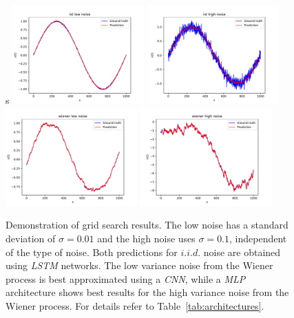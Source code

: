 \begin{figure}s
\centering
    \includegraphics[width=0.45\textwidth]{figures/iid_low_noise.pdf}
    \includegraphics[width=0.45\textwidth]{figures/iid_high_noise.pdf}
    \includegraphics[width=0.45\textwidth]{figures/wiener_low_noise.pdf}
    \includegraphics[width=0.45\textwidth]{figures/wiener_high_noise.pdf}
    \caption{Demonstration of grid search results. The low noise has a
    standard deviation of $\sigma =0.01$ and the high noise uses $\sigma=0.1$,
    independent of the type of noise. Both predictions for $i.i.d.$ noise 
    are obtained using \emph{LSTM} networks. The low variance noise from the 
    Wiener process is best approximated using a \emph{CNN}, while a \emph{MLP}
    architecture shows best results for the high variance noise from the 
    Wiener process. For details refer to Table~\ref{tab:architectures}.}
    \label{fig:sineresult}
\end{figure}

